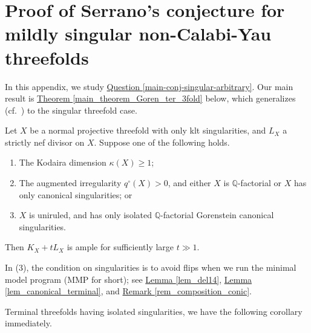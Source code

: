 \appendix
{}
\renewcommand{\appendixtocname}{Appendix}
\addappheadtotoc


\section{Proof of Serrano's conjecture for  mildly singular non-Calabi-Yau threefolds}
\label{appendix}
In this appendix, we study  {\hyperref[main-conj-singular-arbitrary]{Question  \ref*{main-conj-singular-arbitrary}}}. 
Our main result is {\hyperref[main_theorem_Goren_ter_3fold]{Theorem   \ref*{main_theorem_Goren_ter_3fold}}} below, which generalizes \cite[Theorem 0.4]{CCP08} (cf.~\cite[Section 4]{Ser95}) to the singular threefold case.

\begin{thm}\label{main_theorem_Goren_ter_3fold}
Let $X$ be a normal projective threefold with only klt singularities, 
and $L_X$ a strictly nef divisor on $X$.
Suppose one of the following holds.
\begin{enumerate}
\item[(1)] The Kodaira dimension $\kappa(X)\geqslant 1$;
\item[(2)] The augmented irregularity $q^{\circ}(X)>0$, and either $X$ is $\mathbb{Q}$-factorial or $X$ has only canonical singularities; or
\item[(3)] $X$ is uniruled, and  has only isolated $\mathbb{Q}$-factorial Gorenstein canonical singularities. 
\end{enumerate}
Then $K_X+tL_X$ is ample for sufficiently large $t\gg 1$.
\end{thm}

In (3), the condition on singularities is  to avoid flips when we run the minimal model program (MMP for short); see  {\hyperref[lem_del14]{Lemma  \ref*{lem_del14}}}, {\hyperref[lem_canonical_terminal]{Lemma  \ref*{lem_canonical_terminal}}}, and {\hyperref[rem_composition_conic]{Remark  \ref*{rem_composition_conic}}}.


Terminal threefolds having isolated singularities, we have the following corollary immediately.

